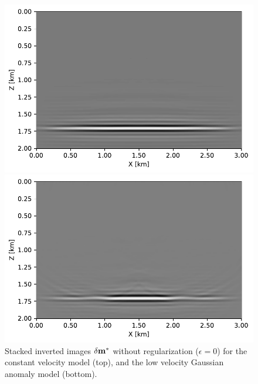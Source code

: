 \begin{figure}[h]
\centering
\includegraphics[width=0.7\linewidth]{Fig/noanomaly-inverted-image-stack.pdf}

\vspace*{-0.3cm}
\includegraphics[width=0.7\linewidth]{Fig/anomaly-inverted-image-stack.pdf}

\vspace*{-0.5cm}
\caption{Stacked inverted images $\delta \mathbf{m}^{\ast}$ without regularization ($\epsilon = 0$) for the constant velocity model (top), and the low velocity Gaussian anomaly model (bottom).}
\label{fig:example1_stacks_noreg}
\end{figure}